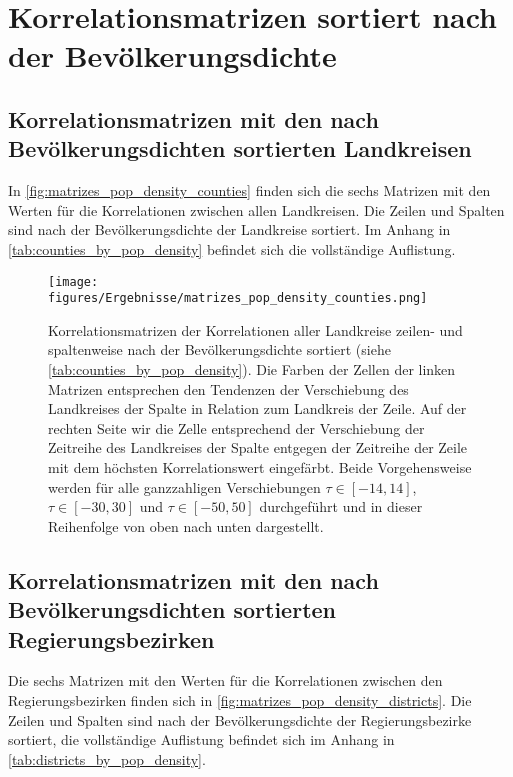 \section{Korrelationsmatrizen sortiert nach der Bevölkerungsdichte}
\subsection{Korrelationsmatrizen mit den nach Bevölkerungsdichten sortierten Landkreisen}
In \autoref{fig:matrizes_pop_density_counties} finden sich die sechs Matrizen mit den Werten für die Korrelationen zwischen allen Landkreisen. Die Zeilen und Spalten sind nach der Bevölkerungsdichte der Landkreise sortiert. Im Anhang in \autoref{tab:counties_by_pop_density} befindet sich die vollständige Auflistung.

\begin{figure}[H]
    \centering
    \texttt{[image: figures/Ergebnisse/matrizes\_pop\_density\_counties.png]}
    \caption{Korrelationsmatrizen der Korrelationen aller Landkreise zeilen- und spaltenweise nach der Bevölkerungsdichte sortiert (siehe \autoref{tab:counties_by_pop_density}). Die Farben der Zellen der linken Matrizen entsprechen den Tendenzen der Verschiebung des Landkreises der Spalte in Relation zum Landkreis der Zeile.
    Auf der rechten Seite wir die Zelle entsprechend der Verschiebung der Zeitreihe des Landkreises der Spalte entgegen der Zeitreihe der Zeile mit dem höchsten Korrelationswert eingefärbt. Beide Vorgehensweise werden für alle ganzzahligen Verschiebungen $\tau\in[-14,14]$,  $\tau\in[-30,30]$ und  $\tau\in[-50,50]$ durchgeführt und in dieser Reihenfolge von oben nach unten dargestellt.}
    \label{fig:matrizes_pop_density_counties}
\end{figure}
\subsection{Korrelationsmatrizen mit den nach Bevölkerungsdichten sortierten Regierungsbezirken}
Die sechs Matrizen mit den Werten für die Korrelationen zwischen den Regierungsbezirken finden sich in \autoref{fig:matrizes_pop_density_districts}. Die Zeilen und Spalten sind nach der Bevölkerungsdichte der Regierungsbezirke sortiert, die vollständige Auflistung befindet sich im Anhang in \autoref{tab:districts_by_pop_density}.


